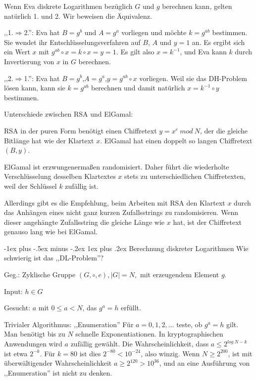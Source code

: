 \documentclass[a4paper]{article}
\makeatletter
\renewcommand{\subsubsection}{\@startsection{subsubsection}{3}{0mm}%
 {-1ex plus -.5ex minus -.2ex}%
 {1ex plus .2ex}%
 {\normalfont\small\bfseries}}
\makeatother
\begin{document}
\begin{multicols}{3}
        Wenn Eva diskrete Logarithmen bezüglich $G$ und $g$ berechnen kann, gelten natürlich 1. und 2. Wir beweisen die Äquivalenz.

        \begin{itemize*}
            \item ,,1.$\Rightarrow$2.'': Eva hat $B=g^b$ und $A=g^a$ vorliegen und möchte $k=g^{ab}$ bestimmen. Sie wendet ihr Entschlüsselungsverfahren auf $B$, $A$ und $y=1$ an. Es ergibt sich ein Wert $x$ mit $g^{ab}\circ x=k\circ x=y=1$. Es gilt also $x=k^{-1}$, und Eva kann $k$ durch Invertierung von $x$ in $G$ berechnen.
            \item ,,2.$\Rightarrow$1.'': Eva hat $B=g^b$,$A=g^a$,$y=g^{ab}\circ x$ vorliegen. Weil sie das DH-Problem lösen kann, kann sie $k=g^{ab}$ berechnen und damit natürlich $x=k^{-1}\circ y$ bestimmen.
        \end{itemize*}

        Unterschiede zwischen RSA und ElGamal:
        \begin{itemize*}
            \item RSA in der puren Form benötigt einen Chiffretext $y=x^e\ mod\ N$, der die gleiche Bitlänge hat wie der Klartext $x$. ElGamal hat einen doppelt so langen Chiffretext $(B,y)$.
            \item ElGamal ist erzwungenermaßen randomisiert. Daher führt die wiederholte Verschlüsselung desselben Klartextes $x$ stets zu unterschiedlichen Chiffretexten, weil der Schlüssel $k$ zufällig ist.
        \end{itemize*}

        Allerdings gibt es die Empfehlung, beim Arbeiten mit RSA den Klartext $x$ durch das Anhängen eines nicht ganz kurzen Zufallsstrings zu
        randomisieren. Wenn dieser angehängte Zufallsstring die gleiche Länge wie $x$ hat, ist der Chiffretext genauso lang wie bei ElGamal.

        \subsubsection{Berechnung diskreter Logarithmen}
        Wie schwierig ist das ,,DL-Problem''?

        Geg.: Zyklische Gruppe $(G,\circ,e),|G|=N,$ mit erzeugendem Element $g$.

        Input: $h\in G$

        Gesucht: $a$ mit $0\leq a<N$, das $g^a=h$ erfüllt.

        Trivialer Algorithmus: ,,Enumeration''
        Für $a=0,1,2 ,...$ teste, ob $g^a=h$ gilt. Man benötigt bis zu $N$ schnelle Exponentiationen. In kryptographischen Anwendungen wird $a$ zufällig gewählt. Die Wahrscheinlichkeit, dass $a\leq 2^{log\ N-k}$ ist etwa $2^{-k}$. Für $k= 80$ ist dies $2^{-80}< 10^{-24}$, also winzig. Wenn $N\geq 2^{200}$, ist mit überwältigender Wahrscheinlichkeit $a\geq 2^{120}> 10^{36}$, und an eine Ausführung von ,,Enumeration'' ist nicht zu denken.


\end{multicols}
\end{document}

